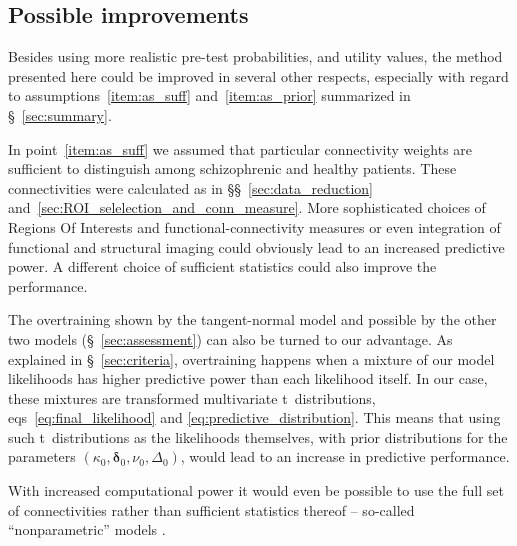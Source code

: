 \documentclass[%
]{frontiersSCNS-nologo} %
\newcommand*{\sect}{\S} %
\newcommand*{\sects}{\S\S} %
\newcommand*{\eqns}{eqs}
\newcommand*{\cf}{{cf.}}
\renewcommand*{\|}{\mathpunct{|}}%
\newcommand*{\ymu}{\bm{\delta}}
\newcommand*{\yka}{\kappa}
\newcommand*{\ynu}{\nu}
\newcommand*{\yLa}{\bm{\varDelta}}
\newcommand*{\ymuo}{\ymu_0}
\newcommand*{\ykao}{\yka_0}
\newcommand*{\ynuo}{\ynu_0}
\newcommand*{\yLao}{\yLa_0}
\begin{document}
\subsection{Possible improvements}
\label{sec:improvements}

Besides using more realistic pre-test probabilities, and utility values,
the method presented here could be improved in several other respects,
especially with regard to assumptions~\ref{item:as_suff}
and~\ref{item:as_prior} summarized in \sect~\ref{sec:summary}.

In point~\ref{item:as_suff} we assumed that particular connectivity weights
are sufficient to distinguish among schizophrenic and healthy patients.
These connectivities were calculated as in \sects~\ref{sec:data_reduction}
and~\ref{sec:ROI_selelection_and_conn_measure}. More sophisticated choices
of Regions Of Interests and functional-connectivity measures
\citep{marrelecetal2011,Smith2011,Wang2014,gheiratmandetal2017,demircietal2008}
or even integration of functional and structural imaging
\citep{michaeletal2010} could obviously lead to an increased predictive
power. A different choice of sufficient statistics could also improve the
performance.

The overtraining shown by the tangent-normal model and possible by the other
two models (\sect~\ref{sec:assessment}) can also be turned to our
advantage. As explained in \sect~\ref{sec:criteria}, overtraining happens
when a mixture of our model likelihoods has higher predictive power than
each likelihood itself. In our case, these mixtures are transformed
multivariate t~distributions, \eqns~\eqref{eq:final_likelihood} and
\eqref{eq:predictive_distribution}. This means that using such
t~distributions as the likelihoods themselves, with prior distributions for
the parameters $(\ykao,\ymuo,\ynuo,\yLao)$, would lead to an increase
in predictive performance. 

With increased computational power it would even be possible to use the
full set of connectivities rather than sufficient statistics thereof --
so-called \enquote{nonparametric} models
\citetext{\citealp{muelleretal2004b,hjortetal2010};
  \citealp[\cf][]{zhangetal2014b,zhangetal2016,nielsenetal2016,kooketal2017}}.
\end{document}
